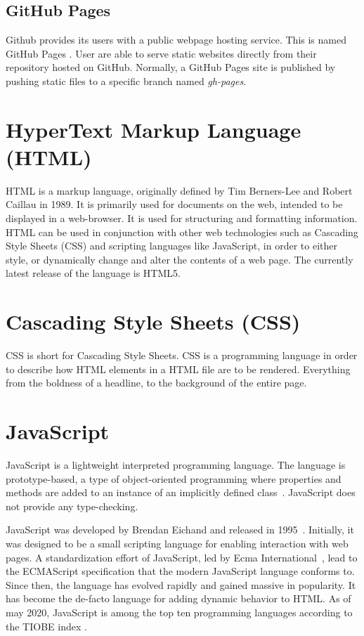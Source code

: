 \subsection{GitHub Pages}
Github provides its users with a public webpage hosting service. This is named GitHub Pages \cite{github-pages}. User are able to serve static websites directly from their repository hosted on GitHub. Normally, a GitHub Pages site is published by pushing static files to a specific branch named \textit{gh-pages}.

\section{HyperText Markup Language (HTML)}
HTML is a markup language, originally defined by Tim Berners-Lee and Robert Caillau in 1989. It is primarily used for documents on the web, intended to be displayed in a web-browser. It is used for structuring and formatting information. HTML can be used in conjunction with other web technologies such as Cascading Style Sheets (CSS) and scripting languages like JavaScript, in order to either style, or dynamically change and alter the contents of a web page. The currently latest release of the language is HTML5.

\section{Cascading Style Sheets (CSS)}
CSS is short for Cascading Style Sheets. CSS is a programming language in order to describe how HTML elements in a HTML file are to be rendered. Everything from the boldness of a headline, to the background of the entire page.

\section{JavaScript}
JavaScript is a lightweight interpreted programming language. The language is prototype-based, a type of object-oriented programming where properties and methods are added to an instance of an implicitly defined class~\cite{prototype-based-programming}. JavaScript does not provide any type-checking.

JavaScript was developed by Brendan Eichand and released in 1995~\cite{javascript-original-release}. Initially, it was designed to be a small scripting language for enabling interaction with web pages. A standardization effort of JavaScript, led by Ecma International~\cite{ecma-international}, lead to the ECMAScript specification that the modern JavaScript language conforms to. Since then, the language has evolved rapidly and gained massive in popularity. It has become the de-facto language for adding dynamic behavior to HTML. As of may 2020, JavaScript is among the top ten programming languages according to the TIOBE index \cite{tiobe-index}.

